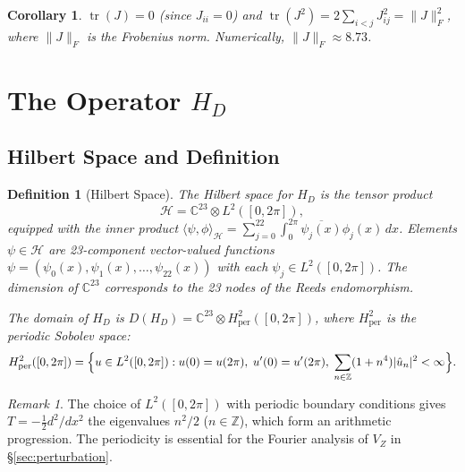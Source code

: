 \documentclass[11pt,a4paper]{article}
\theoremstyle{plain}
\newtheorem{corollary}[theorem]{Corollary}
\newtheorem{definition}[theorem]{Definition}
\theoremstyle{remark}
\newtheorem{remark}[theorem]{Remark}
\newcommand{\Z}{\mathbb{Z}}
\newcommand{\C}{\mathbb{C}}
\newcommand{\HH}{\mathcal{H}}
\DeclareMathOperator{\tr}{tr}
\newcommand{\norm}[1]{\lVert #1 \rVert}
\begin{document}
\begin{corollary}\label{cor:J-trace}
$\tr(J)=0$ (since $J_{ii}=0$) and
$\tr(J^2)=2\sum_{i<j}J_{ij}^2=\norm{J}_F^2$, where $\norm{J}_F$
is the Frobenius norm.  Numerically, $\norm{J}_F\approx 8.73$.
\end{corollary}

\section{The Operator $H_D$}\label{sec:operator}

\subsection{Hilbert Space and Definition}

\begin{definition}[Hilbert Space]\label{def:hilbert-space}
The Hilbert space for $H_D$ is the tensor product
\begin{equation}\label{eq:hilbert-space}
  \HH=\C^{23}\otimes L^2([0,2\pi]),
\end{equation}
equipped with the inner product
$\langle\psi,\phi\rangle_\HH=\sum_{j=0}^{22}\int_0^{2\pi}
\overline{\psi_j(x)}\phi_j(x)\,dx$.
Elements $\psi\in\HH$ are 23-component vector-valued functions
$\psi=(\psi_0(x),\psi_1(x),\ldots,\psi_{22}(x))$ with each
$\psi_j\in L^2([0,2\pi])$.  The dimension of $\C^{23}$ corresponds
to the 23 nodes of the Reeds endomorphism.

The domain of $H_D$ is
$D(H_D)=\C^{23}\otimes H^2_{\mathrm{per}}([0,2\pi])$,
where $H^2_{\mathrm{per}}$ is the periodic Sobolev space:
\[
  H^2_{\mathrm{per}}([0,2\pi])=\Bigl\{u\in L^2([0,2\pi]):
  u(0)=u(2\pi),\;u'(0)=u'(2\pi),\;\sum_{n\in\Z}(1+n^4)|\hat{u}_n|^2<\infty\Bigr\}.
\]
\end{definition}

\begin{remark}
The choice of $L^2([0,2\pi])$ with periodic boundary conditions gives
$T=-\frac{1}{2}d^2/dx^2$ the eigenvalues $n^2/2$ ($n\in\Z$), which
form an arithmetic progression.  The periodicity is essential for the
Fourier analysis of $V_Z$ in \S\ref{sec:perturbation}.
\end{remark}
\end{document}
